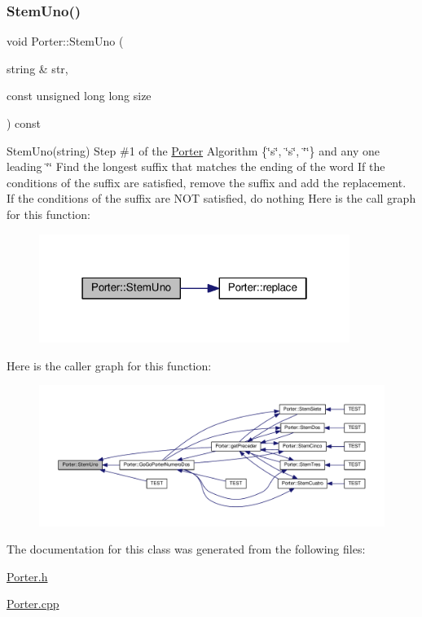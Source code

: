 \subsubsection{\texorpdfstring{Stem\+Uno()}{StemUno()}}
{\footnotesize\ttfamily void Porter\+::\+Stem\+Uno (\begin{DoxyParamCaption}\item[{string \&}]{str,  }\item[{const unsigned long long}]{size }\end{DoxyParamCaption}) const}

Stem\+Uno(string) Step \#1 of the \hyperlink{class_porter}{Porter} Algorithm \{\char`\"{}\textquotesingle{}s\textquotesingle{}\char`\"{}, \char`\"{}\textquotesingle{}s\char`\"{}, \char`\"{}\textquotesingle{}\char`\"{}\} and any one leading \char`\"{}\textquotesingle{}\char`\"{} Find the longest suffix that matches the ending of the word If the conditions of the suffix are satisfied, remove the suffix and add the replacement. If the conditions of the suffix are N\+OT satisfied, do nothing Here is the call graph for this function\+:
\nopagebreak
\begin{figure}[H]
\begin{center}
\leavevmode
\includegraphics[width=286pt]{class_porter_ad8b63c9741655393ff9c849d269c953a_cgraph}
\end{center}
\end{figure}
Here is the caller graph for this function\+:
\nopagebreak
\begin{figure}[H]
\begin{center}
\leavevmode
\includegraphics[width=350pt]{class_porter_ad8b63c9741655393ff9c849d269c953a_icgraph}
\end{center}
\end{figure}


The documentation for this class was generated from the following files\+:\begin{DoxyCompactItemize}
\item 
\hyperlink{_porter_8h}{Porter.\+h}\item 
\hyperlink{_porter_8cpp}{Porter.\+cpp}\end{DoxyCompactItemize}
